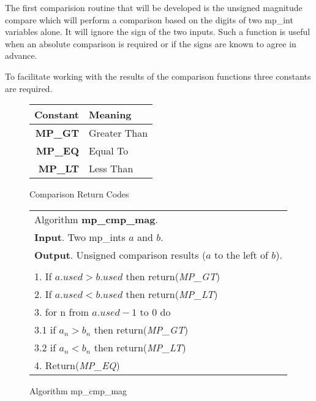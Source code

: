 \documentclass[b5paper]{book}
\begin{document}
The first comparision routine that will be developed is the unsigned magnitude compare which will perform a comparison based on the digits of two
mp\_int variables alone.  It will ignore the sign of the two inputs.  Such a function is useful when an absolute comparison is required or if the 
signs are known to agree in advance.

To facilitate working with the results of the comparison functions three constants are required.  

\begin{figure}[here]
\begin{center}
\begin{tabular}{|r|l|}
\hline \textbf{Constant} & \textbf{Meaning} \\
\hline \textbf{MP\_GT} & Greater Than \\
\hline \textbf{MP\_EQ} & Equal To \\
\hline \textbf{MP\_LT} & Less Than \\
\hline
\end{tabular}
\end{center}
\caption{Comparison Return Codes}
\end{figure}

\begin{figure}[here]
\begin{center}
\begin{tabular}{l}
\hline Algorithm \textbf{mp\_cmp\_mag}. \\
\textbf{Input}.   Two mp\_ints $a$ and $b$.  \\
\textbf{Output}.  Unsigned comparison results ($a$ to the left of $b$). \\
\hline \\
1.  If $a.used > b.used$ then return(\textit{MP\_GT}) \\
2.  If $a.used < b.used$ then return(\textit{MP\_LT}) \\
3.  for n from $a.used - 1$ to 0 do \\
\hspace{+3mm}3.1  if $a_n > b_n$ then return(\textit{MP\_GT}) \\
\hspace{+3mm}3.2  if $a_n < b_n$ then return(\textit{MP\_LT}) \\
4.  Return(\textit{MP\_EQ}) \\
\hline
\end{tabular}
\end{center}
\caption{Algorithm mp\_cmp\_mag}
\end{figure}
\end{document}
